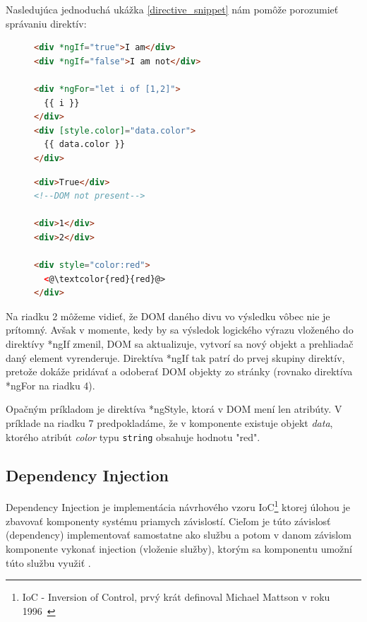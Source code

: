 \documentclass[
  digital, %
  twoside, %
  notable,   %
  nolof,   %
  nolot,   %
]{fithesis3}
\begin{document}
Nasledujúca jednoduchá ukážka \ref{directive_snippet} nám pomôže porozumieť správaniu direktív:
\begin{figure}
 \centering
 \begin{minipage}{.59\textwidth}

  \centering
  \begin{lstlisting}[language=HTML,caption={Direktívy použité v template (vľavo) a ako ich vo výsledku vníma prehliadač (vpravo)},label=directive_snippet]
<div *ngIf="true">I am</div>
<div *ngIf="false">I am not</div>

<div *ngFor="let i of [1,2]">
  {{ i }}
</div>
<div [style.color]="data.color">
  {{ data.color }}
</div>
  \end{lstlisting}

 \end{minipage}
 \begin{minipage}{.39\textwidth}

  \centering
  \begin{lstlisting}[language=HTML,numbers=none,xleftmargin=0em]
<div>True</div>
<!--DOM not present-->

<div>1</div>
<div>2</div>

<div style="color:red">
  <@\textcolor{red}{red}@>
</div>
  \end{lstlisting}
 
 \end{minipage}
\end{figure}

Na riadku 2 môžeme vidieť, že DOM daného divu vo výsledku vôbec nie je prítomný. Avšak v momente, kedy by sa výsledok logického výrazu vloženého do direktívy *ngIf zmenil, DOM sa aktualizuje, vytvorí sa nový objekt a prehliadač daný element vyrenderuje. Direktíva *ngIf tak patrí do prvej skupiny direktív, pretože dokáže pridávať a odoberať DOM objekty zo stránky (rovnako direktíva *ngFor na riadku 4).

Opačným príkladom je direktíva *ngStyle, ktorá v DOM mení len atribúty. V príklade na riadku 7 predpokladáme, že v komponente existuje objekt \textit{data}, ktorého atribút \textit{color} typu \texttt{string} obsahuje hodnotu "red".

\subsection{Dependency Injection}
\label{sec_di}
Dependency Injection je implementácia návrhového vzoru IoC\footnote{IoC - Inversion of Control, prvý krát definoval Michael Mattson v roku 1996~\cite{mattsson1996object}} ktorej úlohou je zbavovať komponenty systému priamych závislostí. Cieľom je túto závislosť (dependency) implementovať samostatne ako službu a potom v danom závislom komponente vykonať injection (vloženie služby), ktorým sa komponentu umožní túto službu využiť \cite{chiba2005aspect, yang2008empirical}.
\end{document}
